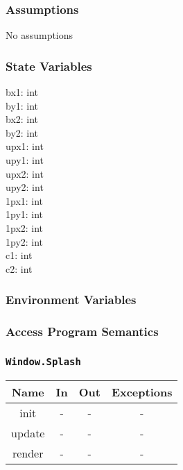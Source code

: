 \documentclass[11pt, oneside]{article}   	%
\begin{document}
\subsubsection{Assumptions}
No assumptions

\subsubsection{State Variables}
bx1: int\\
by1: int \\
bx2: int \\
by2: int \\
upx1: int\\
upy1: int \\
upx2: int \\
upy2: int \\
1px1: int \\
1py1: int \\
1px2: int \\
1py2: int \\
c1: int \\
c2: int \\



\subsubsection{Environment Variables}




\subsubsection{Access Program Semantics} 


\subsubsection{\texttt{Window.Splash}}



\begin{center}
\begin{tabular}{ |c|c|c|c| } 
 \hline
 Name & In & Out & Exceptions \\ 
 \hline \hline
 init & - & - & - \\ 
 update & - & - & - \\ 
 render & - & - & - \\ 

 \hline
\end{tabular}
\end{center}
\end{document}
